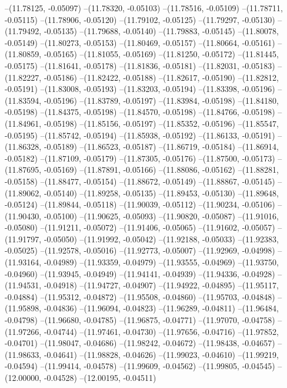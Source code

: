 --(11.78125, -0.05097)
--(11.78320, -0.05103)
--(11.78516, -0.05109)
--(11.78711, -0.05115)
--(11.78906, -0.05120)
--(11.79102, -0.05125)
--(11.79297, -0.05130)
--(11.79492, -0.05135)
--(11.79688, -0.05140)
--(11.79883, -0.05145)
--(11.80078, -0.05149)
--(11.80273, -0.05153)
--(11.80469, -0.05157)
--(11.80664, -0.05161)
--(11.80859, -0.05165)
--(11.81055, -0.05169)
--(11.81250, -0.05172)
--(11.81445, -0.05175)
--(11.81641, -0.05178)
--(11.81836, -0.05181)
--(11.82031, -0.05183)
--(11.82227, -0.05186)
--(11.82422, -0.05188)
--(11.82617, -0.05190)
--(11.82812, -0.05191)
--(11.83008, -0.05193)
--(11.83203, -0.05194)
--(11.83398, -0.05196)
--(11.83594, -0.05196)
--(11.83789, -0.05197)
--(11.83984, -0.05198)
--(11.84180, -0.05198)
--(11.84375, -0.05198)
--(11.84570, -0.05198)
--(11.84766, -0.05198)
--(11.84961, -0.05198)
--(11.85156, -0.05197)
--(11.85352, -0.05196)
--(11.85547, -0.05195)
--(11.85742, -0.05194)
--(11.85938, -0.05192)
--(11.86133, -0.05191)
--(11.86328, -0.05189)
--(11.86523, -0.05187)
--(11.86719, -0.05184)
--(11.86914, -0.05182)
--(11.87109, -0.05179)
--(11.87305, -0.05176)
--(11.87500, -0.05173)
--(11.87695, -0.05169)
--(11.87891, -0.05166)
--(11.88086, -0.05162)
--(11.88281, -0.05158)
--(11.88477, -0.05154)
--(11.88672, -0.05149)
--(11.88867, -0.05145)
--(11.89062, -0.05140)
--(11.89258, -0.05135)
--(11.89453, -0.05130)
--(11.89648, -0.05124)
--(11.89844, -0.05118)
--(11.90039, -0.05112)
--(11.90234, -0.05106)
--(11.90430, -0.05100)
--(11.90625, -0.05093)
--(11.90820, -0.05087)
--(11.91016, -0.05080)
--(11.91211, -0.05072)
--(11.91406, -0.05065)
--(11.91602, -0.05057)
--(11.91797, -0.05050)
--(11.91992, -0.05042)
--(11.92188, -0.05033)
--(11.92383, -0.05025)
--(11.92578, -0.05016)
--(11.92773, -0.05007)
--(11.92969, -0.04998)
--(11.93164, -0.04989)
--(11.93359, -0.04979)
--(11.93555, -0.04969)
--(11.93750, -0.04960)
--(11.93945, -0.04949)
--(11.94141, -0.04939)
--(11.94336, -0.04928)
--(11.94531, -0.04918)
--(11.94727, -0.04907)
--(11.94922, -0.04895)
--(11.95117, -0.04884)
--(11.95312, -0.04872)
--(11.95508, -0.04860)
--(11.95703, -0.04848)
--(11.95898, -0.04836)
--(11.96094, -0.04823)
--(11.96289, -0.04811)
--(11.96484, -0.04798)
--(11.96680, -0.04785)
--(11.96875, -0.04771)
--(11.97070, -0.04758)
--(11.97266, -0.04744)
--(11.97461, -0.04730)
--(11.97656, -0.04716)
--(11.97852, -0.04701)
--(11.98047, -0.04686)
--(11.98242, -0.04672)
--(11.98438, -0.04657)
--(11.98633, -0.04641)
--(11.98828, -0.04626)
--(11.99023, -0.04610)
--(11.99219, -0.04594)
--(11.99414, -0.04578)
--(11.99609, -0.04562)
--(11.99805, -0.04545)
--(12.00000, -0.04528)
--(12.00195, -0.04511)
